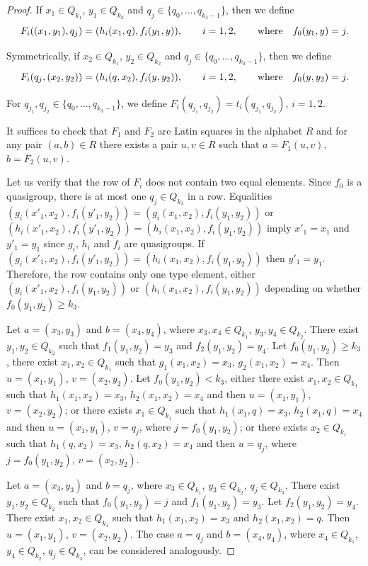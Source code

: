 \documentclass[11pt]{article}
\theoremstyle{definition}
\begin{document}
{{{\begin{proof}
 If $x_1\in Q_{k_1}$, $y_1\in Q_{k_2}$ and $q_j\in
\{q_0,\dots,q_{k_3-1}\}$, then we define
$$F_i((x_1,y_1),q_j)=(h_i(x_1,q),f_i(y_1,y)), \qquad i=1,2,\qquad \mbox{\rm where}\quad
f_0(y_1,y)=j.$$

Symmetrically, if $x_2\in Q_{k_1}$, $y_2\in Q_{k_2}$ and $q_j\in
\{q_0,\dots,q_{k_3-1}\}$, then we define
$$F_i(q_j,(x_2,y_2))=(h_i(q,x_2),f_i(y,y_2)), \qquad i=1,2, \qquad \mbox{\rm where}\quad
f_0(y,y_2)=j.$$

For $q_{j_1},q_{j_2}\in \{q_0,\dots,q_{k_3-1}\}$, we define
$F_i(q_{j_1},q_{j_2})=t_i(q_{j_1},q_{j_2})$, $i=1,2$.

It suffices to check that $F_1$ and $F_2$ are Latin
squares in the alphabet $R$ and for any pair $(a,b)\in R$ there exists
a pair $u,v\in R$ such that $a=F_1(u,v)$, $b=F_2(u,v)$. 

Let us verify that the  row of $F_i$ does not contain two equal elements.  Since $f_0$ is a quasigroup, there is at most  one $q_j\in Q_{k_3}$ in a row.  Equalities $(g_i(x'_1,x_2),f_i(y'_1,y_2))=(g_i(x_1,x_2),f_i(y_1,y_2))$  or $(h_i(x'_1,x_2),f_i(y'_1,y_2))=(h_i(x_1,x_2),f_i(y_1,y_2))$ imply $x'_1=x_1$ and $y'_1=y_1$  since $g_i$, $h_i$ and $f_i$ are quasigroups.  If  $(g_i(x'_1,x_2),f_i(y'_1,y_2))=(h_i(x_1,x_2),f_i(y_1,y_2))$ then $y'_1=y_1$. Therefore, the row contains only one type element, either  $(g_i(x'_1,x_2),f_i(y_1,y_2))$ or $(h_i(x_1,x_2),f_i(y_1,y_2))$ depending on whether $f_0(y_1,y_2)\geq k_3$.


 Let $a=(x_3,y_3)$ and
$b=(x_4,y_4)$, where $x_3,x_4\in Q_{k_1}$, $y_3,y_4\in Q_{k_2}$.
There exist $y_1,y_2 \in Q_{k_2}$ such that $f_1(y_1,y_2)=y_3$ and
$f_2(y_1,y_2)=y_4$. Let $f_0(y_1,y_2)\geq k_3$, there exist
$x_1,x_2\in Q_{k_1}$ such that $g_1(x_1,x_2)=x_3$,
$g_2(x_1,x_2)=x_4$. Then $u=(x_1,y_1)$, $v=(x_2,y_2)$. Let
$f_0(y_1,y_2)< k_3$, either there exist $x_1,x_2\in Q_{k_1}$ such that
$h_1(x_1,x_2)=x_3$, $h_2(x_1,x_2)=x_4$ and then $u=(x_1,y_1)$,
$v=(x_2,y_2)$; or there exists $x_1\in Q_{k_1}$ such that $h_1(x_1,q)=x_3$,
$h_2(x_1,q)=x_4$ and then $u=(x_1,y_1)$, $v=q_j$, where
$j=f_0(y_1,y_2)$; or there exists $x_2\in Q_{k_1}$ such that
$h_1(q,x_2)=x_3$, $h_2(q,x_2)=x_4$ and then $u=q_j$, where
$j=f_0(y_1,y_2)$, $v=(x_2,y_2)$.

Let $a=(x_3,y_3)$ and $b=q_j$, where $x_3\in Q_{k_1}$, $y_3\in
Q_{k_2}$, $q_j\in Q_{k_3}$. There exist $y_1,y_2 \in Q_{k_2}$ such
that $f_0(y_1,y_2)=j$ and $f_1(y_1,y_2)=y_3$. Let
$f_2(y_1,y_2)=y_4$. There exist $x_1,x_2\in Q_{k_1}$ such that
$h_1(x_1,x_2)=x_3$ and $h_2(x_1,x_2)=q$. Then $u=(x_1,y_1)$,
$v=(x_2,y_2)$. The case $a=q_j$ and
$b=(x_4,y_4)$, where $x_4\in Q_{k_1}$, $y_4\in Q_{k_2}$, $q_j\in
Q_{k_3}$, can be considered analogously.


\end{proof}}}}
\end{document}
